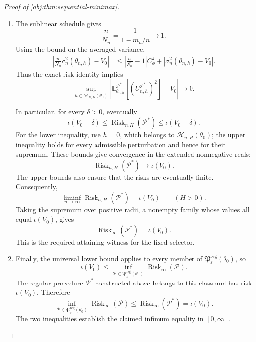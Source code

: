 \begin{proof}[Proof of \cref{obj:thm:sequential-minimax}]
\begin{enumerate}
\item
The sublinear schedule gives
\[
\frac n{N_n}
=
\frac1{1-m_n/n}\longrightarrow1.
\]
Using the bound on the averaged variance,
\[
\begin{aligned}
\left|
\frac n{N_n}\overline\sigma_n^2(\theta_{n,h})-V_0
\right|
&\le
\left|\frac n{N_n}-1\right|C_\phi^2
+
|\overline\sigma_n^2(\theta_{n,h})-V_0|.
\end{aligned}
\]
Thus the exact risk identity implies
\[
\sup_{h\in\mathcal H_{n,H}(\theta_0)}
\left|
\mathbb E_{\theta_{n,h}}^{\mathcal P^*}
[(U_{n,h}^{\mathcal P^*})^2]-V_0
\right|
\longrightarrow0.
\]

In particular, for every \(\delta>0\), eventually
\[
\iota(V_0-\delta)
\le
\operatorname{Risk}_{n,H}(\mathcal P^*)
\le
\iota(V_0+\delta).
\]
For the lower inequality, use \(h=0\), which belongs to
\(\mathcal H_{n,H}(\theta_0)\); the upper inequality holds for every admissible perturbation and hence for their supremum. These bounds give convergence in the extended nonnegative reals:
\[
\operatorname{Risk}_{n,H}(\mathcal P^*)\longrightarrow\iota(V_0).
\]
The upper bounds also ensure that the risks are eventually finite. Consequently,
\[
\liminf_{n\to\infty}\operatorname{Risk}_{n,H}(\mathcal P^*)
=
\iota(V_0)
\qquad(H>0).
\]
Taking the supremum over positive radii, a nonempty family whose values all equal \(\iota(V_0)\), gives
\[
\operatorname{Risk}_{\infty}(\mathcal P^*)=\iota(V_0).
\]
This is the required attaining witness for the fixed selector.

\item
Finally, the universal lower bound applies to every member of
\(\mathfrak P^{\mathrm{reg}}_\varepsilon(\theta_0)\), so
\[
\iota(V_0)
\le
\inf_{\mathcal P\in\mathfrak P^{\mathrm{reg}}_\varepsilon(\theta_0)}
\operatorname{Risk}_{\infty}(\mathcal P).
\]
The regular procedure \(\mathcal P^*\) constructed above belongs to this class and has risk \(\iota(V_0)\). Therefore
\[
\inf_{\mathcal P\in\mathfrak P^{\mathrm{reg}}_\varepsilon(\theta_0)}
\operatorname{Risk}_{\infty}(\mathcal P)
\le
\operatorname{Risk}_{\infty}(\mathcal P^*)
=
\iota(V_0).
\]
The two inequalities establish the claimed infimum equality in \([0,\infty]\).
\end{enumerate}
\end{proof}


